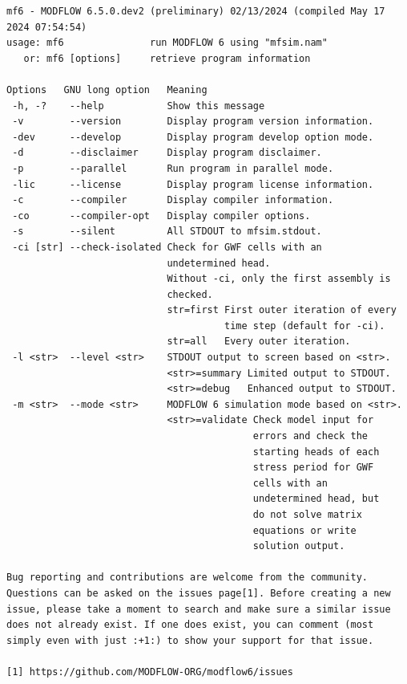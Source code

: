 {\small
\begin{lstlisting}[style=modeloutput]
mf6 - MODFLOW 6.5.0.dev2 (preliminary) 02/13/2024 (compiled May 17 2024 07:54:54)
usage: mf6               run MODFLOW 6 using "mfsim.nam"
   or: mf6 [options]     retrieve program information

Options   GNU long option   Meaning 
 -h, -?    --help           Show this message
 -v        --version        Display program version information.
 -dev      --develop        Display program develop option mode.
 -d        --disclaimer     Display program disclaimer.
 -p        --parallel       Run program in parallel mode.
 -lic      --license        Display program license information.
 -c        --compiler       Display compiler information.
 -co       --compiler-opt   Display compiler options.
 -s        --silent         All STDOUT to mfsim.stdout.
 -ci [str] --check-isolated Check for GWF cells with an
                            undetermined head.
                            Without -ci, only the first assembly is
                            checked.
                            str=first First outer iteration of every
                                      time step (default for -ci).
                            str=all   Every outer iteration.
 -l <str>  --level <str>    STDOUT output to screen based on <str>.
                            <str>=summary Limited output to STDOUT.
                            <str>=debug   Enhanced output to STDOUT.
 -m <str>  --mode <str>     MODFLOW 6 simulation mode based on <str>.
                            <str>=validate Check model input for
                                           errors and check the
                                           starting heads of each
                                           stress period for GWF
                                           cells with an
                                           undetermined head, but
                                           do not solve matrix
                                           equations or write
                                           solution output.
                                                                    
Bug reporting and contributions are welcome from the community. 
Questions can be asked on the issues page[1]. Before creating a new
issue, please take a moment to search and make sure a similar issue
does not already exist. If one does exist, you can comment (most
simply even with just :+1:) to show your support for that issue.
                                                                    
[1] https://github.com/MODFLOW-ORG/modflow6/issues
\end{lstlisting}
}
